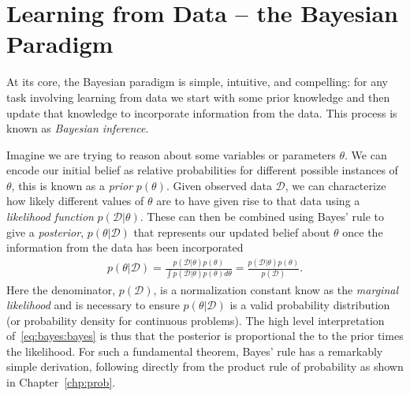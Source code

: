 
\section{Learning from Data -- the Bayesian Paradigm}
\label{sec:bayes:paradigm}

At its core, the Bayesian paradigm is simple, intuitive, and compelling: for any task involving
learning from data we start with some prior knowledge and then update that knowledge to
incorporate information from the data.  This process is known as \emph{Bayesian inference}.

Imagine we are trying to reason about some variables
or parameters $\theta$.  We can encode our initial belief as relative probabilities for different
possible instances of $\theta$, this is known as a \emph{prior} $p(\theta)$.  Given observed data
$\mathcal{D}$, we can characterize how likely different values of $\theta$ are to have given rise
to that data using a \emph{likelihood function} $p(\mathcal{D}|\theta)$.  These can then be
combined using Bayes' rule to give a \emph{posterior}, $p(\theta | \mathcal{D})$ that 
represents our updated belief about $\theta$ once the information from the data has been
incorporated
\begin{align}
	\label{eq:bayes:bayes}
	p(\theta | \mathcal{D}) = \frac{p(\mathcal{D} | \theta)p(\theta)}{\int p(\mathcal{D} | \theta)p(\theta) d\theta} 
	= \frac{p(\mathcal{D} | \theta)p(\theta)}{p(\mathcal{D})}.
\end{align}
Here the denominator, $p(\mathcal{D})$, is a normalization constant know as the \emph{marginal
	likelihood} and is necessary to ensure $p(\theta | \mathcal{D})$ is a valid probability distribution
(or probability density for continuous problems).  The high level interpretation of~\eqref{eq:bayes:bayes} is
thus that the posterior is proportional the to the prior times the likelihood.  
For such a fundamental theorem, Bayes' rule has a remarkably simple derivation, following directly
from the product rule of probability as shown in Chapter~\ref{chp:prob}.

